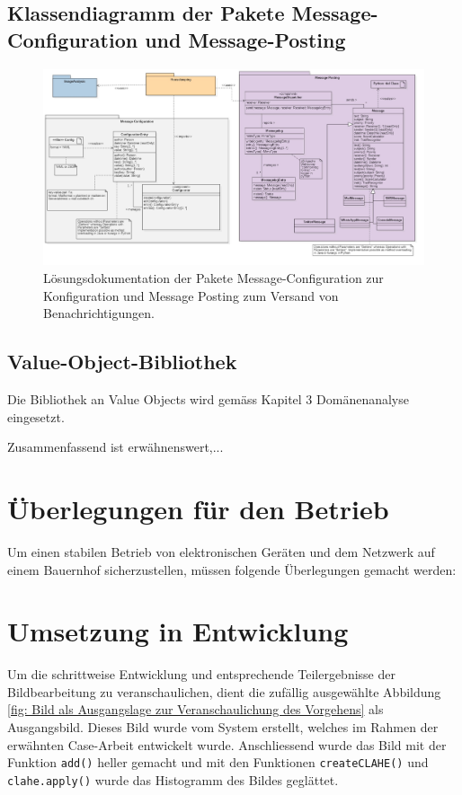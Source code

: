 \begin{landscape}
\subsection{Klassendiagramm der Pakete Message-Configuration und Message-Posting}
\begin{figure}[H]
	\center
	\includegraphics[scale=0.43]{Grafiken/modelle/solution-messaging.jpg}
	\caption{Lösungsdokumentation der Pakete Message-Configuration zur Konfiguration und Message Posting zum Versand von Benachrichtigungen.} 
	\label{fig: Lösungsdokumentation der Pakete Message-Configuration zur Konfiguration und Message Posting zum Versand von Benachrichtigungen.}
\end{figure}

\subsection{Value-Object-Bibliothek}
Die Bibliothek an Value Objects wird gemäss Kapitel 3 Domänenanalyse eingesetzt.

Zusammenfassend ist erwähnenswert,... 

\end{landscape}
\restoregeometry %

\section{Überlegungen für den Betrieb}

Um einen stabilen Betrieb von elektronischen Geräten und dem Netzwerk auf einem Bauernhof sicherzustellen, müssen folgende Überlegungen gemacht werden:


\newpage


\section{Umsetzung in Entwicklung}
Um die schrittweise Entwicklung und entsprechende Teilergebnisse der Bildbearbeitung zu veranschaulichen, dient die zufällig ausgewählte Abbildung \ref{fig: Bild als Ausgangslage zur Veranschaulichung des Vorgehens} als Ausgangsbild. Dieses Bild wurde vom System erstellt, welches im Rahmen der erwähnten Case-Arbeit entwickelt wurde. Anschliessend wurde das Bild mit der Funktion \texttt{add()} heller gemacht und mit den Funktionen \texttt{createCLAHE()} und \texttt{clahe.apply()} wurde das Histogramm des Bildes geglättet. 

